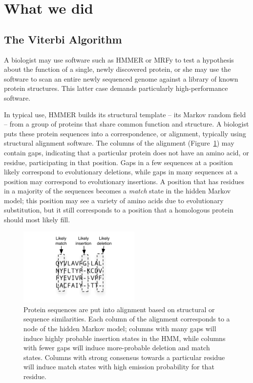 \documentclass[preprint,nocopyrightspace,times]{sigplanconf}
\begin{document}


\section{What we did}

\subsection{The Viterbi Algorithm}

A biologist may use software such as HMMER or MRFy to test a hypothesis about 
the function of a single, newly discovered protein, or she may use the software 
to scan an entire newly sequenced genome against a library of known protein 
structures. This latter case demands particularly high-performance software.

In typical use, HMMER builds its structural template -- its Markov random field 
-- from a group of proteins that share common function and structure. A 
biologist puts these protein sequences into a correspondence, or alignment, 
typically using structural alignment software. The columns of the alignment 
(Figure~\ref{alignment}) may contain gaps, indicating that a particular protein 
does not have an amino acid, or residue, participating in that position. Gaps 
in a few sequences at a position likely correspond to evolutionary deletions, 
while gaps in many sequences at a position may correspond to evolutionary 
insertions. A position that has residues in a majority of the sequences becomes 
a \textit{match} state in the hidden Markov model; this position may see a 
variety of amino acids due to evolutionary substitution, but it still 
corresponds to a position that a homologous protein should most likely fill.

\begin{figure}\centerline{\includegraphics[width=6cm]{alignment.pdf}} 
\caption{Protein sequences are put into alignment based on structural or 
sequence similarities. Each column of the alignment corresponds to a node of 
the hidden Markov model; columns with many gaps will induce highly probable 
insertion states in the HMM, while columns with fewer gaps will induce 
more-probable deletion and match states. Columns with strong consensus towards 
a particular residue will induce match states with high emission probability 
for that residue.}\label{alignment} \end{figure}
\end{document}
